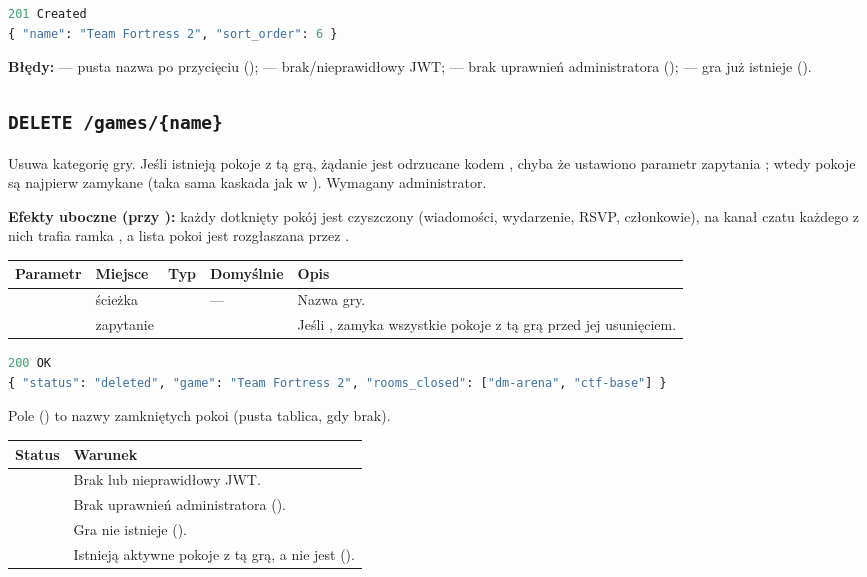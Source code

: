 \begin{lstlisting}[language=Python]
201 Created
{ "name": "Team Fortress 2", "sort_order": 6 }
\end{lstlisting}

\textbf{Błędy:}  --- pusta nazwa po przycięciu ();
 --- brak/nieprawidłowy JWT;  --- brak uprawnień administratora
();  --- gra już istnieje ().

\subsection{\texttt{DELETE /games/\{name\}}}

Usuwa kategorię gry. Jeśli istnieją pokoje z tą grą, żądanie jest odrzucane kodem , chyba
że ustawiono parametr zapytania ; wtedy pokoje są najpierw zamykane (taka sama
kaskada jak w ). Wymagany administrator.

\textbf{Efekty uboczne (przy ):} każdy dotknięty pokój jest czyszczony (wiadomości,
wydarzenie, RSVP, członkowie), na kanał czatu każdego z nich trafia ramka , a lista
pokoi jest rozgłaszana przez .

\begin{tabularx}{\textwidth}{llllY}
\toprule
Parametr & Miejsce & Typ & Domyślnie & Opis \\
\midrule
{} & ścieżka &  & --- & Nazwa gry. \\
 & zapytanie &  &  & Jeśli , zamyka wszystkie pokoje z tą grą przed jej usunięciem. \\
\bottomrule
\end{tabularx}

\begin{lstlisting}[language=Python]
200 OK
{ "status": "deleted", "game": "Team Fortress 2", "rooms_closed": ["dm-arena", "ctf-base"] }
\end{lstlisting}

Pole  () to nazwy zamkniętych pokoi (pusta tablica, gdy brak).

\begin{tabularx}{\textwidth}{lY}
\toprule
Status & Warunek \\
\midrule
{} & Brak lub nieprawidłowy JWT. \\
 & Brak uprawnień administratora (). \\
 & Gra nie istnieje (). \\
 & Istnieją aktywne pokoje z tą grą, a  nie jest  (). \\
\bottomrule
\end{tabularx}

